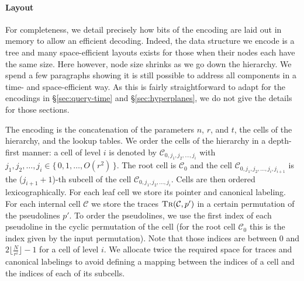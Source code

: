 \paragraph*{Layout}
For completeness, we detail precisely how bits of the encoding are
laid out in memory to allow an efficient decoding.
%
Indeed, the data structure we encode is a tree and many space-efficient layouts
exists for those when their nodes each have the same size. Here however, node
size shrinks as we go down the hierarchy.
We spend a few paragraphs showing it
is still possible to
address all components in a
time- and space-efficient way.
%
As this is fairly straightforward to adapt for the encodings in
\S\ref{sec:query-time} and \S\ref{sec:hyperplanes},
we do not give the details for those sections.
%


The encoding is the concatenation of
the parameters \(n\), \(r\), and \( t\),
the cells of the hierarchy,
and
the lookup tables.
%
We order the cells of the hierarchy in a depth-first manner: a cell of level
\(i\) is denoted by \(\mathcal{C}_{0, j_1, j_2, \ldots, j_i}\)
with \(j_1, j_2, \ldots, j_i \in \{\, 0, 1, \ldots, O(r^2)\,\}\).
The root cell is
\(\mathcal{C}_0\) and the cell \(\mathcal{C}_{0, j_1, j_2, \ldots, j_i, j_{i+1}}\) is
the (\(j_{i+1} + 1\))-th subcell of the cell
\(\mathcal{C}_{0, j_1, j_2, \ldots, j_i}\).
%
Cells are then ordered lexicographically.
%
For each leaf cell we store its pointer and canonical labeling.
%
For each internal cell \(\mathcal{C}\) we store the traces
\(\textsc{Tr}(\mathcal{C}, p')\) in a certain permutation of the pseudolines
\(p'\).
%
To order the pseudolines, we use the first index of each pseudoline
in the cyclic permutation of the cell (for the root cell \(\mathcal{C}_0\) this
is the index given by the input permutation).
%
Note that those indices are between \(0\) and \(2 \lfloor \frac{N}{r^{i}}
\rfloor - 1\) for a cell of level \(i\). We allocate twice the required space
for traces and canonical labelings to avoid defining a mapping between the
indices of a cell and the indices of each of its subcells.

